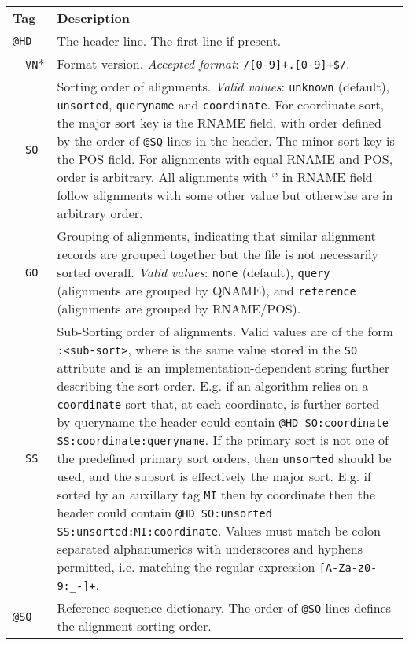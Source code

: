 \documentclass[10pt]{article}
\begin{document}
\begin{center}
\small
\begin{longtable}{|l|l|p{13.5cm}|}
  \cline{1-3}
  \multicolumn{2}{|l|}{\bf Tag} & {\bf Description} \\
  \cline{1-3}
  \multicolumn{2}{|l}{\tt @HD} & The header line. The first line if present. \\\cline{2-3}
  & {\tt VN}* & Format version. \emph{Accepted format}: {\tt /\char94[0-9]+\char92.[0-9]+\$/}.\\\cline{2-3}
  & {\tt SO} & Sorting order of alignments. \emph{Valid values}: {\tt unknown} (default), {\tt
    unsorted}, {\tt queryname} and {\tt coordinate}. For coordinate sort, the major sort
  key is the {\sf RNAME} field, with order defined by the order of {\tt @SQ} lines in the header.  The
  minor sort key is the {\sf POS} field.  For alignments with equal {\sf RNAME} and {\sf POS}, order is
  arbitrary.  All alignments with `{\tt *}' in {\sf RNAME} field follow alignments with some other
  value but otherwise are in arbitrary order.\\\cline{2-3}
  & {\tt GO} & Grouping of alignments, indicating that similar alignment records
    are grouped together but the file is not necessarily sorted overall.
    \emph{Valid values}: {\tt none} (default), {\tt query} (alignments are
    grouped by {\sf QNAME}), and {\tt reference} (alignments are grouped by
    {\sf RNAME}/{\sf POS}).\\\cline{1-3}
  & {\tt SS} & Sub-Sorting order of alignments. Valid values are of the form {\tt <sort-order>:<sub-sort>}, where {\tt <sort-order>} is the same value stored in the {\tt SO} attribute and {\tt <sub-sort>} is an implementation-dependent string further describing the sort order.
    E.g. if an algorithm relies on a {\tt coordinate} sort that, at each coordinate, is further sorted by queryname the header could contain {\tt @HD SO:coordinate SS:coordinate:queryname}.
    If the primary sort is not one of the predefined primary sort orders, then {\tt unsorted} should be used, and the subsort is effectively the major sort.
    E.g. if sorted by an auxillary tag {\tt MI} then by coordinate then the header could contain {\tt @HD SO:unsorted SS:unsorted:MI:coordinate}.
    Values must match be colon separated alphanumerics with underscores and hyphens permitted, i.e. matching the regular expression {\tt [A-Za-z0-9:\_-]+}. \\\cline{1-3}
  \multicolumn{2}{|l}{\tt @SQ} & Reference sequence dictionary. The order of {\tt @SQ} lines defines the alignment sorting order.\\\cline{2-3}

\end{longtable}
\end{center}
\end{document}
